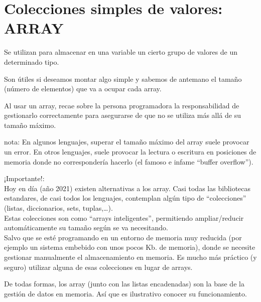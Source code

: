 \documentclass[spanish,12pt,a4paper,final,oneside]{book}
\begin{document}
\section{Colecciones simples de valores: ARRAY}
Se utilizan para almacenar en una variable un cierto grupo de valores de un determinado tipo.

Son útiles si deseamos montar algo simple y sabemos de antemano el tamaño (número de elementos) que va a ocupar cada array.

Al usar un array, recae sobre la persona programadora la responsabilidad de gestionarlo correctamente para asegurarse de que no se utiliza más allá de su tamaño máximo. 

nota: En algunos lenguajes, superar el tamaño máximo del array suele provocar un error. En otros lenguajes, suele provocar la lectura o escritura en posiciones de memoria donde no correspondería hacerlo (el famoso e infame ``buffer overflow'').

¡Importante!: 
\\Hoy en día (año 2021) existen alternativas a los array. Casi todas las bibliotecas estandares, de casi todos los lenguajes, contemplan algún tipo de ``colecciones'' (listas, diccionarios, sets, tuplas,\ldots).
\\ Estas colecciones son como  ``arrays inteligentes'', permitiendo ampliar/reducir automáticamente su tamaño según se va necesitando.
\\ Salvo que se esté programando en un entorno de memoria muy reducida (por ejemplo un sistema embebido con unos pocos Kb. de memoria), donde se necesite gestionar manualmente el almacenamiento en memoria. Es mucho más práctico (y seguro) utilizar alguna de esas colecciones en lugar de arrays.

De todas formas, los array (junto con las listas encadenadas) son la base de la gestión de datos en memoria. Así que es ilustrativo conocer su funcionamiento.
\end{document}
